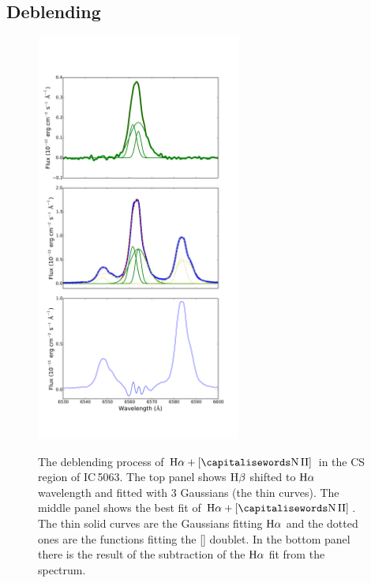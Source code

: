 \documentclass[../thesis.tex]{subfiles}
\begin{document}
\subsection{Deblending}
\label{sec:deblending}

\begin{figure}
\centering
\includegraphics[width=0.6\textwidth]{images/paper1/ha2.pdf} \\
\caption[]{The deblending process of $\Ha + [\ion{N}{II}]$ in the CS region of IC\,5063. The top panel shows $\rm H\beta$ shifted to $\rm H\alpha$ wavelength and fitted with $3$ Gaussians (the thin curves). The middle panel shows the best fit of $\Ha+[\ion{N}{II}]$. The thin solid curves are the Gaussians fitting $\rm H\alpha$ and the dotted ones are the functions fitting the [] doublet. In the bottom panel there is the result of the subtraction of the $\rm H\alpha$ fit from the spectrum. }
\label{fig:hadeb}
\end{figure}
\end{document}
